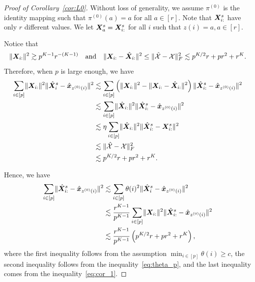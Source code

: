 \documentclass[lettersize,onecolumn,journal]{IEEEtran}
\theoremstyle{definition}
\theoremstyle{definition}
\newcommand{\of}[1]{\left(#1\right)}
\begin{document}
\begin{proof} [Proof of Corollary~\ref{cor:L0}]
Without loss of generality, we assume $\pi^{(0)}$ is the identity mapping such that  $\pi^{(0)}(a) = a$ for all $ a \in [r]$. Note that $\bm X_{i:}^s$ have only $r$ different values. We let $\bm X_a^s = \bm X_{i:}^s$ for all $i$ such that $z(i) = a, a \in [r]$. 

Notice that 
\begin{equation}
    \lVert\bm X_{i:}\rVert^2 \gtrsim p^{K-1} r^{-(K-1)} \quad \text{and} \quad \lVert\bm X_{i:} - \hat {\bm X}_{i:}\rVert^2 \leq \lVert\hat {\mathcal{X}} - \mathcal{X}\rVert_F^2 \lesssim  p^{K/2}r + pr^2 + r^K .
\end{equation}
Therefore, when $p$ is large enough, we have 
\begin{align}
    \sum_{i \in [p]} \onormSize{}{\mX_{i:}}^2 \onormSize{}{\hat \mX_i^s - \hat \mx_{z^{(0)}(i)}}^2 &\lesssim \sum_{i \in [p]} \of{\onormSize{}{\mX_{i:}}^2 - \onormSize{}{\mX_{i:} - \hat \mX_{i:}}^2} \onormSize{}{\hat \mX_{i:}^s - \hat \mx_{z^{(0)}(i)}}^2\\
   & \lesssim \sum_{i \in [p]} \onormSize{}{\hat \mX_{i:}}^2 \onormSize{}{\hat \mX_{i:}^s - \hat \mx_{z^{(0)}(i)}}^2 \\
   & \lesssim \eta  \sum_{i \in [p]} \onormSize{}{\hat \mX_{i:}}^2 \onormSize{}{\hat \mX_{i:}^s - \mX_{i:}^s}^2 \\
   & \lesssim \onormSize{}{\hat \tX - \tX}_F^2 \\
   & \lesssim p^{K/2}r + pr^2 + r^K .\label{eq:cor_1}
\end{align}

Hence, we have 
\begin{align}
    \sum_{i \in [p]} \onormSize{}{\hat \mX_{i:}^s - \hat \mx_{z^{(0)}(i)}}^2 &\lesssim \sum_{i \in [p]} \theta(i)^2 \onormSize{}{\hat \mX_i^s - \hat \mx_{z^{(0)}(i)}}^2 \\
    &\lesssim \frac{r^{K-1}}{p^{K-1}} \sum_{i \in [p]} \onormSize{}{\mX_{i:}}^2 \onormSize{}{\hat \mX_{i:}^s - \hat \mx_{z^{(0)}(i)}}^2\\
    & \lesssim \frac{r^{K-1}}{p^{K-1}} \of{ p^{K/2}r + pr^2 + r^K },\label{eq:cor_2}
\end{align}
where the first inequality follows from the assumption $\min_{i \in [p]} \theta(i) \geq c$, the second inequality follows from the inequality~\eqref{eq:theta_p}, and the last inequality comes from the inequality~\eqref{eq:cor_1}.


\end{proof}
\end{document}
